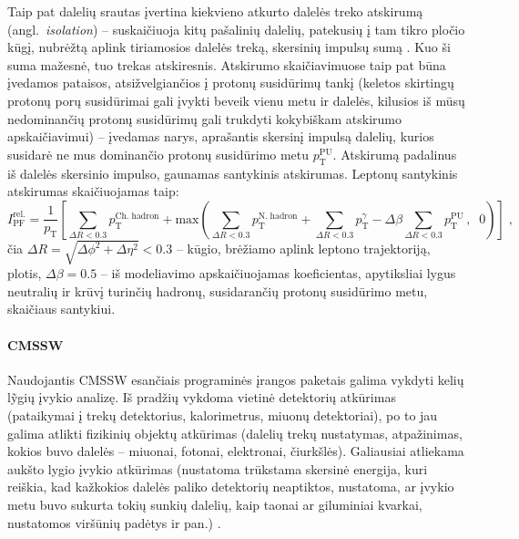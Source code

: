 \documentclass[a4paper, 12pt]{article}
\newlength\q
\begin{document}
Taip pat dalelių srautas įvertina kiekvieno atkurto dalelės treko atskirumą (angl.\ \textit{isolation}) -- suskaičiuoja kitų pašalinių dalelių, patekusių į tam tikro pločio kūgį, nubrėžtą aplink tiriamosios dalelės treką, skersinių impulsų sumą \cite{PF2017}. Kuo ši suma mažesnė, tuo trekas atskiresnis. Atskirumo skaičiavimuose taip pat būna įvedamos pataisos, atsižvelgiančios į protonų susidūrimų tankį (keletos skirtingų protonų porų susidūrimai gali įvykti beveik vienu metu ir dalelės, kilusios iš mūsų nedominančių protonų susidūrimų gali trukdyti kokybiškam atskirumo apskaičiavimui) -- įvedamas narys, aprašantis skersinį impulsą dalelių, kurios susidarė ne mus dominančio protonų susidūrimo metu $p_{\mathrm{T}}^{\mathrm{PU}}$. Atskirumą padalinus iš dalelės skersinio impulso, gaunamas santykinis atskirumas. Leptonų santykinis atskirumas skaičiuojamas taip:
\begin{equation}
\label{eq:isolation}
I^{\mathrm{rel.}}_{\mathrm{PF}}= \frac{1}{p_{\mathrm{T}}} 
\left[ \sum_{\Delta R<0.3} p_{\mathrm{T}}^{\mathrm{Ch.\;hadron}}+\mathrm{max}
\left( \sum_{\Delta R<0.3} p_{\mathrm{T}}^{\mathrm{N.\;hadron}}+\sum_{\Delta R<0.3} p_{\mathrm{T}}^{\gamma}-\Delta \beta \sum_{\Delta R<0.3} p_{\mathrm{T}}^{\mathrm{PU}} \, ,\;\; 0 \right) \right] \; \mathrm{,}
\end{equation}
čia $\Delta R = \sqrt{\Delta \phi^{2} + \Delta \eta^{2}} < 0.3$ -- kūgio, brėžiamo aplink leptono trajektoriją, plotis, $\Delta\beta=0.5$ -- iš modeliavimo apskaičiuojamas koeficientas, apytiksliai lygus neutralių ir krūvį turinčių hadronų, susidarančių protonų susidūrimo metu, skaičiaus santykiui.

\paragraph{CMSSW\\}
Naudojantis CMSSW esančiais programinės įrangos paketais galima vykdyti kelių l\~{y}gių įvykio analizę. Iš pradžių vykdoma vietinė detektorių atkūrimas (pataikymai į trekų detektorius, kalorimetrus, miuonų detektoriai), po to jau galima atlikti fizikinių objektų atkūrimas (dalelių trekų nustatymas, atpažinimas, kokios buvo dalelės -- miuonai, fotonai, elektronai, čiurkšlės). Galiausiai atliekama aukšto lygio įvykio atkūrimas (nustatoma trūkstama skersinė energija, kuri reiškia, kad kažkokios dalelės paliko detektorių neaptiktos, nustatoma, ar įvykio metu buvo sukurta tokių sunkių dalelių, kaip taonai ar giluminiai kvarkai, nustatomos viršūnių padėtys ir pan.) \cite{cmsswtwiki}.
\end{document}
